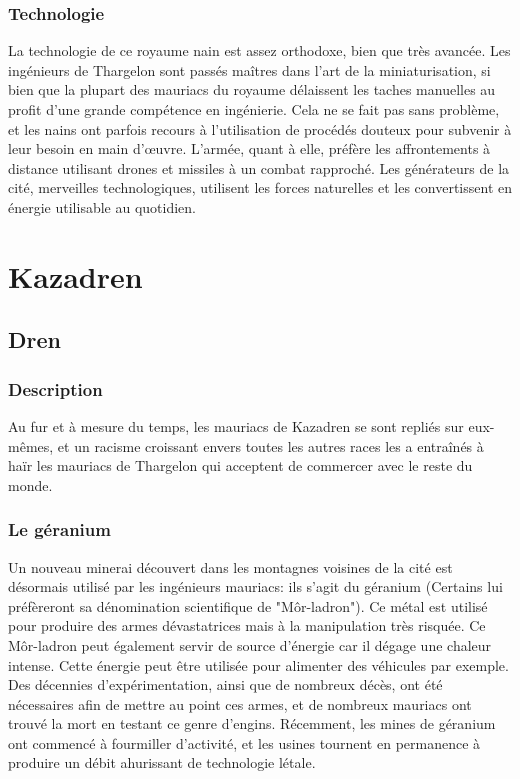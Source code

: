 \subsubsection{Technologie}
La technologie de ce royaume nain est assez orthodoxe, bien que très avancée. Les ingénieurs de Thargelon sont passés maîtres dans l'art de la miniaturisation, si bien que la plupart des mauriacs du royaume délaissent les taches manuelles au profit d'une grande compétence en ingénierie. Cela ne se fait pas sans problème, et les nains ont parfois recours à l'utilisation de procédés douteux pour subvenir à leur besoin en main d’œuvre. L'armée, quant à elle, préfère les affrontements à distance utilisant drones et missiles à un combat rapproché. Les générateurs de la cité, merveilles technologiques, utilisent les forces naturelles et les convertissent en énergie utilisable au quotidien.
\section{Kazadren}
\subsection{Dren}
\subsubsection{Description}
Au fur et à mesure du temps, les mauriacs de Kazadren se sont repliés sur eux-mêmes, et un racisme croissant envers toutes les autres races les a entraînés à haïr les mauriacs de Thargelon qui acceptent de commercer avec le reste du monde.
\subsubsection{Le géranium}
Un nouveau minerai découvert dans les montagnes voisines de la cité est désormais utilisé par les ingénieurs mauriacs: ils s'agit du géranium (Certains lui préfèreront sa dénomination scientifique de "Môr-ladron"). Ce métal est utilisé pour produire des armes dévastatrices mais à la manipulation très risquée. Ce Môr-ladron peut également servir de source d'énergie car il dégage une chaleur intense. Cette énergie peut être utilisée pour alimenter des véhicules par exemple. Des décennies d'expérimentation, ainsi que de nombreux décès, ont été nécessaires afin de mettre au point ces armes, et de nombreux mauriacs ont trouvé la mort en testant ce genre d'engins. Récemment, les mines de géranium ont commencé à fourmiller d'activité, et les usines tournent en permanence à produire un débit ahurissant de technologie létale.
